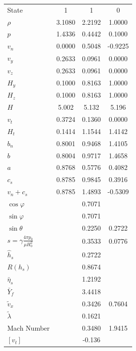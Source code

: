 \documentclass[10.5pt
]{article}
\begin{document}
\begin{tabular}{l|c|c|c}
State &  1 &  1 &  0\\
$\rho$ &  3.1080 &  2.2192 &  1.0000\\
$p$ &  1.4336 &  0.4442 &  0.1000\\
$v_n$ &  0.0000 &  0.5048 &  -0.9225\\
$v_y$ &  0.2633 &  0.0961 &  0.0000\\
$v_z$ &  0.2633 &  0.0961 &  0.0000\\
$H_y$ &  0.1000 &  0.8163 &  1.0000\\
$H_z$ &  0.1000 &  0.8163 &  1.0000\\
$H$ &  5.002 &  5.132 &  5.196\\
$v_t$ &  0.3724 &  0.1360 &  0.0000\\
$H_t$ &  0.1414 &  1.1544 &  1.4142\\
$b_n$ &  0.8001 &  0.9468 &  1.4105\\
$b$ &  0.8004 &  0.9717 &  1.4658\\
$a$ &  0.8768 &  0.5776 &  0.4082\\
$c_s$ &  0.8785 &  0.9845 &  0.3916\\
$v_n+c_s$ &  0.8785 &  1.4893 &  -0.5309\\
$\cos\varphi$ &   &  0.7071 &  \\
$\sin\varphi$ &   &  0.7071 &  \\
$\sin\theta$ &   &  0.2250 &  0.2722\\
$s = \gamma \frac{4\pi p_0}{\mu H_0^2}$ &   &  0.3533 &  0.0776\\
$\hat{h}_s$ &   &  0.2722 &  \\
$R(h_s)$ &   &  0.8674 &  \\
$\bar{\eta}_s$ &   &  1.2192 &  \\
$\bar{Y}_f$ &   &  3.4418 &  \\
$\tilde{v}_x$ &   &  0.3426 &  0.7604\\
$\tilde{\lambda}$ &   &  0.1621 &  \\
Mach Number &   &  0.3480 &  1.9415\\
$[v_t]$ &   &  -0.136
\end{tabular}
\end{document}
